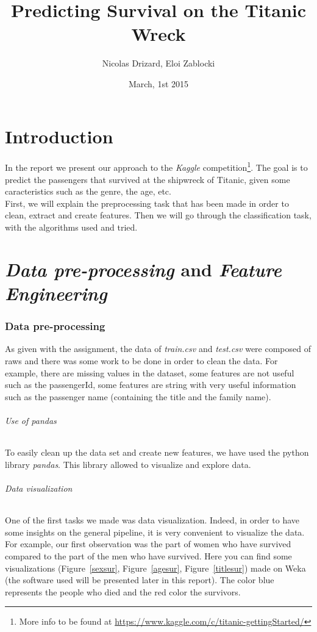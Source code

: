 \documentclass[11pt,a4paper,portrait]{article}
\author{Nicolas Drizard, Eloi Zablocki}
\date{March, 1st 2015}
\title{Predicting Survival on the Titanic Wreck}
\begin{document}
\maketitle


\newpage
\part*{Introduction}
In the report we present our approach to the \textit{Kaggle} competition\footnote{More info to be found at \url{https://www.kaggle.com/c/titanic-gettingStarted/}}. The goal is to predict the passengers that survived at the shipwreck of Titanic, given some caracteristics such as the genre, the age, etc.\\
First, we will explain the preprocessing task that has been made in order to clean, extract and create features. Then we will go through the classification task, with the algorithms used and tried.

\part{\textit{Data pre-processing} and \textit{Feature Engineering}}
\setcounter{section}{0}


\section{Data pre-processing}
As given with the assignment, the data of \textit{train.csv} and \textit{test.csv} were composed of raws and there was some work to be done in order to clean the data. For example, there are missing values in the dataset, some features are not useful such as the passengerId, some features are string with very useful information such as the passenger name (containing the title and the family name).

\paragraph{Use of pandas}
To easily clean up the data set and create new features, we have used the python library \textit{pandas}. This library allowed to visualize and explore data.

\paragraph{Data visualization}
One of the first tasks we made was data visualization. Indeed, in order to have some insights on the general pipeline, it is very convenient to visualize the data. For example, our first observation was the part of women who have survived compared to the part of the men who have survived. Here you can find some visualizations (Figure~\ref{sexsur}, Figure~\ref{agesur}, Figure~\ref{titlesur}) made on Weka (the software used will be presented later in this report). The color blue represents the people who died and the red color the survivors.
\end{document}
